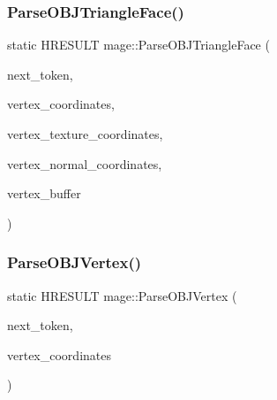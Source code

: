 \subsubsection{\texorpdfstring{Parse\+O\+B\+J\+Triangle\+Face()}{ParseOBJTriangleFace()}\hspace{0.1cm}{\footnotesize\ttfamily [2/2]}}
{\footnotesize\ttfamily static H\+R\+E\+S\+U\+LT mage\+::\+Parse\+O\+B\+J\+Triangle\+Face (\begin{DoxyParamCaption}\item[{char $\ast$$\ast$}]{next\+\_\+token,  }\item[{vector$<$ \hyperlink{structmage_1_1_point3}{Point3} $>$ \&}]{vertex\+\_\+coordinates,  }\item[{vector$<$ X\+M\+F\+L\+O\+A\+T2 $>$ \&}]{vertex\+\_\+texture\+\_\+coordinates,  }\item[{vector$<$ \hyperlink{structmage_1_1_normal3}{Normal3} $>$ \&}]{vertex\+\_\+normal\+\_\+coordinates,  }\item[{vector$<$ \hyperlink{structmage_1_1_vertex}{Vertex} $>$ \&}]{vertex\+\_\+buffer }\end{DoxyParamCaption})\hspace{0.3cm}{\ttfamily [static]}}

\hypertarget{namespacemage_a62daade0727c8a1bc406f5ceb378cc4f}{}\label{namespacemage_a62daade0727c8a1bc406f5ceb378cc4f} 
\subsubsection{\texorpdfstring{Parse\+O\+B\+J\+Vertex()}{ParseOBJVertex()}}
{\footnotesize\ttfamily static H\+R\+E\+S\+U\+LT mage\+::\+Parse\+O\+B\+J\+Vertex (\begin{DoxyParamCaption}\item[{char $\ast$$\ast$}]{next\+\_\+token,  }\item[{vector$<$ \hyperlink{structmage_1_1_point3}{Point3} $>$ \&}]{vertex\+\_\+coordinates }\end{DoxyParamCaption})\hspace{0.3cm}{\ttfamily [static]}}

\hypertarget{namespacemage_a6d1303703ffe653e7cbe67c66d120fa1}{}\label{namespacemage_a6d1303703ffe653e7cbe67c66d120fa1} 
